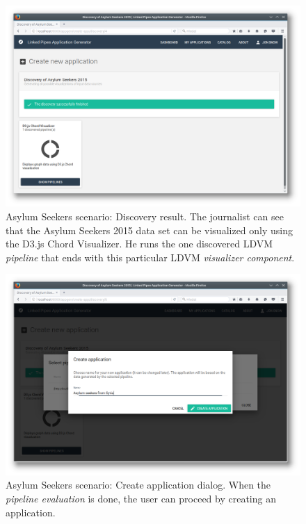 \begin{figure}
	\centering
	\includegraphics[width=145mm]{img/05_scenario_02_discovery_result.png}
	\caption{Asylum Seekers scenario: Discovery result. The journalist can see that the Asylum Seekers 2015 data set can be visualized only using the D3.js Chord Visualizer. He runs the one discovered LDVM \emph{pipeline} that ends with this particular LDVM \emph{visualizer component}.}
	\label{fig:scenario-02-discovery-result}
\end{figure}
\begin{figure}
	\centering
	\includegraphics[width=145mm]{img/05_scenario_03_create_application.png}
	\caption{Asylum Seekers scenario: Create application dialog. When the \emph{pipeline evaluation} is done, the user can proceed by creating an application.}
	\label{fig:scenario-03-create-application}
\end{figure}


